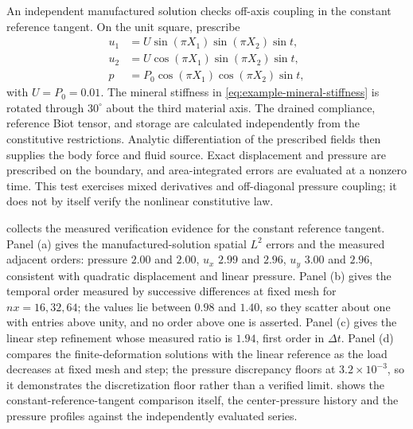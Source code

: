 An independent manufactured solution checks off-axis coupling in the
constant reference tangent. On the unit square, prescribe
\begin{align}
 u_1&=U\sin(\pi X_1)\sin(\pi X_2)\sin t,
 \label{eq:fe-mms-u1}\\
 u_2&=U\cos(\pi X_1)\sin(\pi X_2)\sin t,
 \label{eq:fe-mms-u2}\\
 p&=P_0\cos(\pi X_1)\cos(\pi X_2)\sin t,
 \label{eq:fe-mms-pressure}
\end{align}
with \(U=P_0=0.01\). The mineral stiffness in
\eqref{eq:example-mineral-stiffness} is rotated through \(30^\circ\)
about the third material axis. The drained compliance, reference Biot tensor,
and storage are calculated independently from the constitutive restrictions.
Analytic differentiation of the prescribed fields then supplies the body
force and fluid source. Exact displacement and pressure are prescribed on
the boundary, and area-integrated errors are evaluated at a nonzero time.
This test exercises mixed derivatives and off-diagonal pressure coupling;
it does not by itself verify the nonlinear constitutive law.

 collects the measured verification evidence for
the constant reference tangent. Panel (a) gives the manufactured-solution
spatial \(L^2\) errors and the measured adjacent orders: pressure
\(2.00\) and \(2.00\), \(u_x\) \(2.99\) and \(2.96\), \(u_y\)
\(3.00\) and \(2.96\), consistent with quadratic displacement and linear
pressure. Panel (b) gives the temporal order measured by successive
differences at fixed mesh for \(nx=16,32,64\); the values lie between
\(0.98\) and \(1.40\), so they scatter about one with entries above unity,
and no order above one is asserted. Panel (c) gives
the linear step refinement whose measured ratio is \(1.94\), first order in
\(\Delta t\). Panel (d)
compares the finite-deformation solutions with the linear reference as the
load decreases at fixed mesh and step; the pressure discrepancy floors at
\(3.2\times10^{-3}\), so it demonstrates the discretization floor rather
than a verified limit.  shows the
constant-reference-tangent comparison itself, the center-pressure history
and the pressure profiles against the independently evaluated series.

